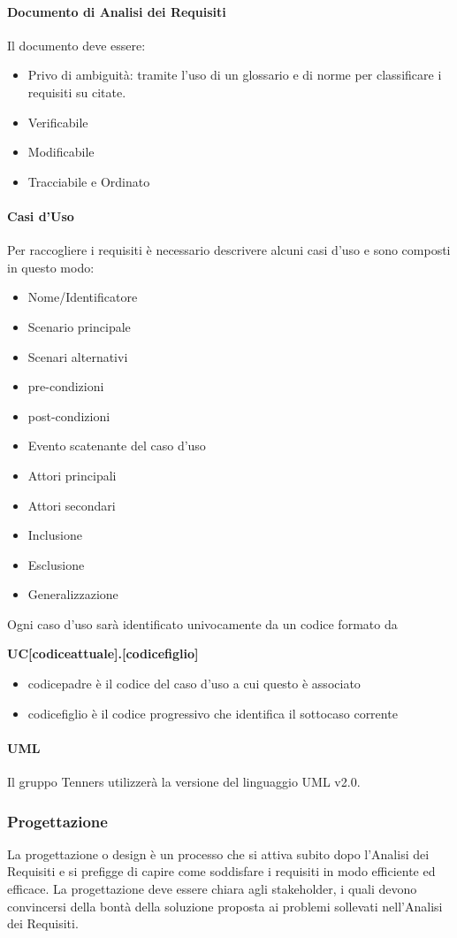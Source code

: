 \paragraph{Documento di Analisi dei Requisiti}
Il documento deve essere:
\begin{itemize}
  \item Privo di ambiguità: tramite l'uso di un glossario e di norme per classificare i requisiti su citate.
  \item Verificabile
  \item Modificabile
  \item Tracciabile e Ordinato
\end{itemize}
\paragraph{Casi d'Uso}
Per raccogliere i requisiti è necessario descrivere alcuni casi d'uso e sono composti in questo modo:
\begin{itemize}
  \item Nome/Identificatore
  \item Scenario principale
  \item Scenari alternativi
  \item pre-condizioni
  \item post-condizioni
  \item Evento scatenante del caso d’uso
  \item Attori principali
  \item Attori secondari
  \item Inclusione
  \item Esclusione
  \item Generalizzazione
\end{itemize}
Ogni caso d'uso sarà identificato univocamente da un codice formato da

\centerline{\textbf{UC[codiceattuale].[codicefiglio]}}
\begin{itemize}
  \item codicepadre è il codice del caso d'uso a cui questo è associato
  \item codicefiglio è il codice progressivo che identifica il sottocaso corrente
\end{itemize}
\paragraph{UML}
Il gruppo Tenners utilizzerà la versione del linguaggio UML v2.0.
\subsubsection{Progettazione}
La progettazione o design è un processo che si attiva subito dopo l'Analisi dei Requisiti e si prefigge di capire come soddisfare i requisiti in modo efficiente ed efficace. La progettazione deve essere chiara agli stakeholder\glo, i quali devono convincersi della bontà della soluzione proposta ai problemi sollevati nell'Analisi dei Requisiti.
